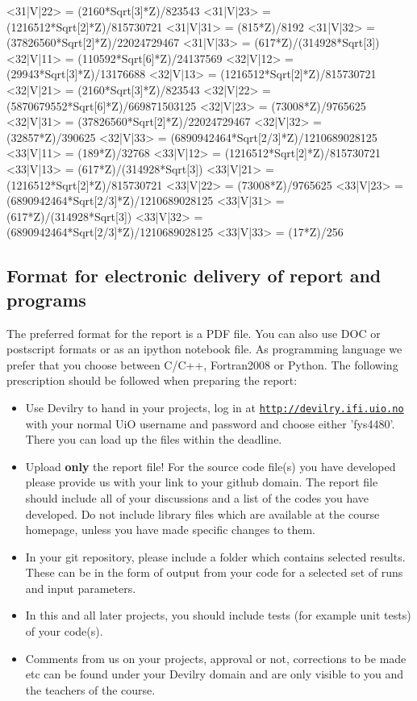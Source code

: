 \documentclass[%
oneside,                 %
final,                   %
10pt]{article}
\begin{document}
<31|V|22> = (2160*Sqrt[3]*Z)/823543
<31|V|23> = (1216512*Sqrt[2]*Z)/815730721
<31|V|31> = (815*Z)/8192
<31|V|32> = (37826560*Sqrt[2]*Z)/22024729467
<31|V|33> = (617*Z)/(314928*Sqrt[3])
<32|V|11> = (110592*Sqrt[6]*Z)/24137569
<32|V|12> = (29943*Sqrt[3]*Z)/13176688
<32|V|13> = (1216512*Sqrt[2]*Z)/815730721
<32|V|21> = (2160*Sqrt[3]*Z)/823543
<32|V|22> = (5870679552*Sqrt[6]*Z)/669871503125
<32|V|23> = (73008*Z)/9765625
<32|V|31> = (37826560*Sqrt[2]*Z)/22024729467
<32|V|32> = (32857*Z)/390625
<32|V|33> = (6890942464*Sqrt[2/3]*Z)/1210689028125
<33|V|11> = (189*Z)/32768
<33|V|12> = (1216512*Sqrt[2]*Z)/815730721
<33|V|13> = (617*Z)/(314928*Sqrt[3])
<33|V|21> = (1216512*Sqrt[2]*Z)/815730721
<33|V|22> = (73008*Z)/9765625
<33|V|23> = (6890942464*Sqrt[2/3]*Z)/1210689028125
<33|V|31> = (617*Z)/(314928*Sqrt[3])
<33|V|32> = (6890942464*Sqrt[2/3]*Z)/1210689028125
<33|V|33> = (17*Z)/256
\eccq





\subsection{Format for electronic delivery of report and programs}

The preferred format for the report is a PDF file. You can also use DOC or postscript formats or as an ipython notebook file.  As programming language we prefer that you choose between C/C++, Fortran2008 or Python. The following prescription should be followed when preparing the report:

\begin{itemize}
  \item Use Devilry to hand in your projects, log in  at  \href{{http://devilry.ifi.uio.no}}{\nolinkurl{http://devilry.ifi.uio.no}} with your normal UiO username and password and choose either 'fys4480'. There you can load up the files within the deadline.

  \item Upload \textbf{only} the report file!  For the source code file(s) you have developed please provide us with your link to your github domain.  The report file should include all of your discussions and a list of the codes you have developed.  Do not include library files which are available at the course homepage, unless you have made specific changes to them.

  \item In your git repository, please include a folder which contains selected results. These can be in the form of output from your code for a selected set of runs and input parameters.

  \item In this and all later projects, you should include tests (for example unit tests) of your code(s).

  \item Comments  from us on your projects, approval or not, corrections to be made  etc can be found under your Devilry domain and are only visible to you and the teachers of the course.
\end{itemize}
\end{document}
